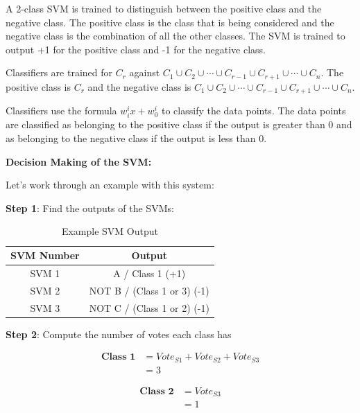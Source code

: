 \documentclass[12pt]{report}
\begin{document}
A 2-class SVM is trained to distinguish between the positive class and the negative class. The positive class is the class that is being considered and the negative class is the combination of all the other classes. The SVM is trained to output +1 for the positive class and -1 for the negative class.

Classifiers are trained for $C_{r}$ against $C_{1} \cup C_{2} \cup \cdots \cup C_{r-1} \cup C_{r+1} \cup \cdots \cup C_{n}$. The positive class is $C_{r}$ and the negative class is $C_{1} \cup C_{2} \cup \cdots \cup C_{r-1} \cup C_{r+1} \cup \cdots \cup C_{n}$.

Classifiers use the formula $w_{i}^{i}x + w_{0}^{i}$ to classify the data points. The data points are classified as belonging to the positive class if the output is greater than 0 and as belonging to the negative class if the output is less than 0.

\vspace*{10pt}

\textbf{Decision Making of the SVM:}\newline

Let's work through an example with this system:\newline

\textbf{Step 1}: Find the outputs of the SVMs:

\begin{table}[H]
	\centering
	\begin{tabular}{|c | c|}
		\hline
		SVM Number & Output                      \\ [0.5ex]
		\hline
		SVM 1      & A / Class 1 (+1)            \\
		\hline
		SVM 2      & NOT B / (Class 1 or 3) (-1) \\
		\hline
		SVM 3      & NOT C / (Class 1 or 2) (-1) \\
		\hline
	\end{tabular}
	\caption{Example SVM Output}
\end{table}

\textbf{Step 2}: Compute the number of votes each class has

\begin{equation*}
	\begin{aligned}
		\textbf{Class 1} & = Vote_{S1} + Vote_{S2} +  Vote_{S3} \\
		                 & = 3
	\end{aligned}
\end{equation*}

\begin{equation*}
	\begin{aligned}
		\textbf{Class 2} & =  Vote_{S3} \\
		                 & = 1
	\end{aligned}
\end{equation*}
\end{document}
